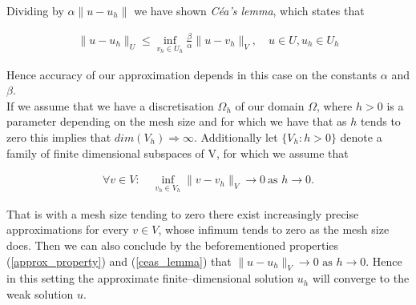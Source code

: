 \documentclass[../draft_1.tex]{subfiles}
\begin{document}
Dividing by $\alpha \| u - u_h \| $ we have shown \textit{C\'{e}a's lemma}, which states that
\begin{ceqn}
\begin{equation}
\begin{aligned}
\label{ceas_lemma}
\| u - u_h \|_U \leq \inf_{v_h \in U_h} \frac{\beta}{\alpha} \| u - v_h \|_V, \quad u \in U, u_h \in U_h
\end{aligned}
\end{equation}
\end{ceqn}
Hence accuracy of our approximation depends in this case on the constants $\alpha$ and $\beta$. 
\bigskip
\\ 
If we assume that we have a discretisation $\Omega_h$ of our domain $\Omega$, where $h > 0$ is a parameter depending on the mesh size and for which we have that as $h$ tends to zero this implies that $dim(V_h) \Rightarrow \infty$. Additionally let $\{V_h : h > 0\}$ denote a family of finite dimensional subspaces of V, for which we assume that
\begin{ceqn}
\begin{equation}
\begin{aligned}
\forall v \in V : \quad \inf_{v_h \in V_h} \| v - v_h\|_V \rightarrow 0 \ \text{as } h \rightarrow 0.
\end{aligned}
\end{equation}
\end{ceqn}
That is with a mesh size tending to zero there exist increasingly precise approximations for every $v \in V$, whose infimum tends to zero as the mesh size does. Then we can also conclude by the beforementioned properties (\ref{approx_property}) and (\ref{ceas_lemma}) that $\| u - u_h\|_V \rightarrow 0 \text{ as } h \rightarrow 0$. Hence in this setting the approximate finite--dimensional solution $u_h$ will converge to the weak solution $u$. 
\end{document}
